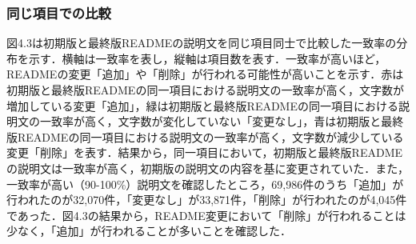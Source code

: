 \documentclass[submit]{ipsj}
\begin{document}
\begin{table}[t]
 \centering
 \caption{初期版と最終版READMEの項目数}
\label{tab:result}
\end{table}
\begin{table}[t]
 \centering
 \caption{初期版と最終版READMEの項目数の変化}
\label{tab:result}
\end{table}


\subsubsection{同じ項目での比較}
図4.3は初期版と最終版READMEの説明文を同じ項目同士で比較した一致率の分布を示す．横軸は一致率を表し，縦軸は項目数を表す．一致率が高いほど，READMEの変更「追加」や「削除」が行われる可能性が高いことを示す．赤は初期版と最終版READMEの同一項目における説明文の一致率が高く，文字数が増加している変更「追加」，緑は初期版と最終版READMEの同一項目における説明文の一致率が高く，文字数が変化していない「変更なし」，青は初期版と最終版READMEの同一項目における説明文の一致率が高く，文字数が減少している変更「削除」を表す．結果から，同一項目において，初期版と最終版READMEの説明文は一致率が高く，初期版の説明文の内容を基に変更されていた．また，一致率が高い（90-100\%）説明文を確認したところ，69,986件のうち「追加」が行われたのが32,070件，「変更なし」が33,871件，「削除」が行われたのが4,045件であった．図4.3の結果から，README変更において「削除」が行われることは少なく，「追加」が行われることが多いことを確認した．
\end{document}
